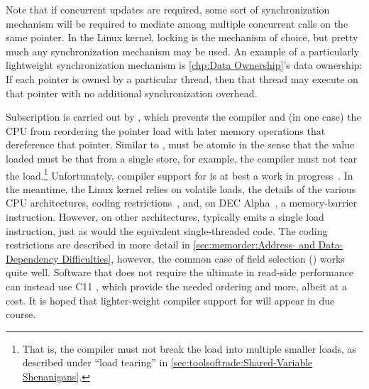 Note that if concurrent updates are required, some sort of synchronization
mechanism will be required to mediate among multiple concurrent
 calls on the same pointer.
In the Linux kernel, locking is the mechanism of choice, but pretty
much any synchronization mechanism may be used.
An example of a particularly lightweight synchronization mechanism is
\cref{chp:Data Ownership}'s data ownership:
If each pointer is owned by a particular thread, then that thread may
execute  on that pointer with no additional
synchronization overhead.

\QuickQuizEnd

Subscription is carried out by , which prevents
the compiler and (in one case) the CPU from reordering the pointer
load with later memory operations that dereference that pointer.
Similar to ,  must be
atomic in the sense that the value loaded must be that from a single
store, for example, the compiler must not tear the load.\footnote{
	That is, the compiler must not break the load into multiple
	smaller loads, as described under ``load tearing'' in
	\cref{sec:toolsoftrade:Shared-Variable Shenanigans}.}
Unfortunately, compiler support for  is at best
a work in progress~\cite{PaulEMcKennneyConsumeP0190R4,PaulEMcKenney2017markconsumeP0462R1,JFBastien2018P0750R1consume}.
In the meantime, the Linux kernel relies on volatile loads, the details of
the various CPU architectures, coding
restrictions~\cite{PaulEMcKenney2014rcu-dereference},
and, on DEC Alpha~\cite{ALPHA2002}, a memory-barrier instruction.
However, on other architectures,  typically
emits a single load instruction, just as would the equivalent single-threaded
code.
The coding restrictions are described in more detail in
\cref{sec:memorder:Address- and Data-Dependency Difficulties},
however, the common case of field selection (\qtco{->}) works quite well.
Software that does not require the ultimate in read-side performance
can instead use C11 , which provide the needed ordering and
more, albeit at a cost.
It is hoped that lighter-weight compiler support for 
will appear in due course.

